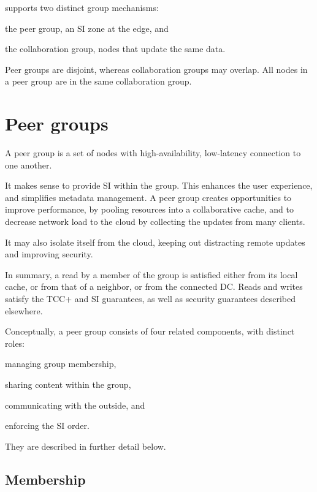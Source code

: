 
\system{} supports two distinct group mechanisms:
\begin{inparablank}
\item
  the peer group, an SI zone at the edge, and
\item
  the collaboration group, nodes that update the same data.
\end{inparablank}
Peer groups are disjoint, whereas collaboration groups may overlap.
All nodes in a peer group are in the same collaboration group.

\section{Peer groups}
\label{sec:peer-groups}

A peer group is a set of nodes with high-availability, low-latency
connection to one another.

It makes sense to provide SI within the group.
This enhances the user experience, and simplifies metadata management.
A peer group creates opportunities to improve performance, by pooling
resources into a collaborative cache, and to decrease network load to
the cloud by collecting the updates from many clients.

It may also isolate itself from the cloud, keeping out distracting
remote updates and improving security.

In summary, a read by a member of the group is satisfied either from its
local cache, or from that of a neighbor, or from the connected DC\@.
Reads and writes satisfy the TCC+ and SI guarantees, as well as security
guarantees described elsewhere.

Conceptually, a peer group consists of four related components, with
distinct roles:
\begin{inparablank}
\item
  managing group membership,
\item
  sharing content within the group,
\item
  communicating with the outside,
and \item
  enforcing the SI order.
\end{inparablank}
They are described in further detail below.

\subsection{Membership}
\label{sec:groups-membership}

